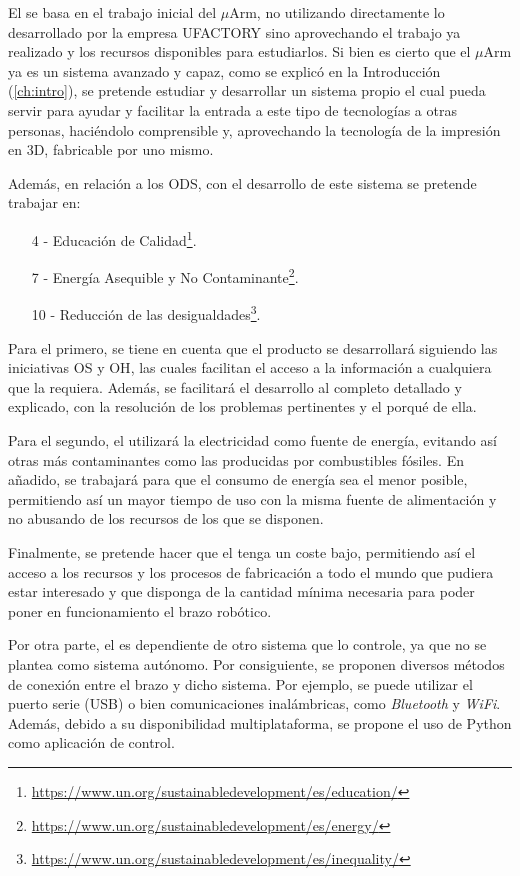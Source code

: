 El \pArm{} se basa en el trabajo inicial del $\mu$Arm, no utilizando directamente lo desarrollado por la empresa UFACTORY sino aprovechando el trabajo ya realizado y los recursos disponibles para estudiarlos. Si bien es cierto que el $\mu$Arm ya es un sistema avanzado y capaz, como se explicó en la Introducción (\ref{ch:intro}), se pretende estudiar y desarrollar un sistema propio el cual pueda servir para ayudar y facilitar la entrada a este tipo de tecnologías a otras personas, haciéndolo comprensible y, aprovechando la tecnología de la impresión en 3D, fabricable por uno mismo.

Además, en relación a los \ac{ODS}, con el desarrollo de este sistema se pretende trabajar en:

\begin{itemize}
    \item [4 -] Educación de Calidad\footnote{\url{https://www.un.org/sustainabledevelopment/es/education/}}.
    \item [7 -] Energía Asequible y No Contaminante\footnote{\url{https://www.un.org/sustainabledevelopment/es/energy/}}.
    \item [10 -] Reducción de las desigualdades\footnote{\url{https://www.un.org/sustainabledevelopment/es/inequality/}}.
\end{itemize}

Para el primero, se tiene en cuenta que el producto se desarrollará siguiendo las iniciativas \ac{OS} y \ac{OH}, las cuales facilitan el acceso a la información a cualquiera que la requiera. Además, se facilitará el desarrollo al completo detallado y explicado, con la resolución de los problemas pertinentes y el porqué de ella.

Para el segundo, el \pArm{} utilizará la electricidad como fuente de energía, evitando así otras más contaminantes como las producidas por combustibles fósiles. En añadido, se trabajará para que el consumo de energía sea el menor posible, permitiendo así un mayor tiempo de uso con la misma fuente de alimentación y no abusando de los recursos de los que se disponen.

Finalmente, se pretende hacer que el \pArm{} tenga un coste bajo, permitiendo así el acceso a los recursos y los procesos de fabricación a todo el mundo que pudiera estar interesado y que disponga de la cantidad mínima necesaria para poder poner en funcionamiento el brazo robótico.

Por otra parte, el \pArm{} es dependiente de otro sistema que lo controle, ya que no se plantea como sistema autónomo. Por consiguiente, se proponen diversos métodos de conexión entre el brazo y dicho sistema. Por ejemplo, se puede utilizar el puerto serie (\ac{USB}) o bien comunicaciones inalámbricas, como \textit{Bluetooth} y \textit{WiFi}. Además, debido a su disponibilidad multiplataforma, se propone el uso de Python como aplicación de control. 

